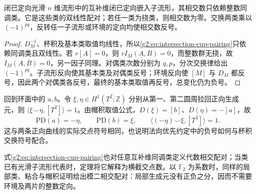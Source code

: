 \begin{corollary}\label{g2:cor:intersection-homological-invariance}
	闭已定向光滑 \(n\) 维流形中的互补维闭已定向嵌入子流形，其相交数只依赖整数同调类。它是这些类的双线性配对；若任一类为挠类，则相交数为零。交换两类乘以 \((-1)^{pq}\)，反转任一子流形或环境的定向均使相交数反号。
\end{corollary}
\begin{proof}
	\(D_M^{-1}\)、杯积及基本类取值均线性，所以\eqref{g2:eq:intersection-cup-pairing}只依赖同调类且双线性。若 \(r[A]=0\)，则 \(rI_M(A,B)=0\)，而整数群无挠，故 \(I_M(A,B)=0\)，另一因子同理。对偶类次数分别为 \(q,p\)，分次交换律给出 \((-1)^{pq}\)。子流形反向使其基本类及对偶类反号；环境反向使 \([M]\) 与 \(D_M\) 都反号，因此两个对偶类各反号，最终的基本类取值再反号，总变化仍为负号。
\end{proof}

\begin{example}\label{g2:exm:torus-poincare-sign-check}
	回到环面中的 \(a,b\)。令 \(\xi,\eta\in H^1(T^2;\mathbb Z)\) 分别从第一、第二圆周拉回正向生成元，则 \(\langle\xi\smile\eta,[T^2]\rangle=1\)。由帽积取值公式，\(D(\xi)=[b]\)、\(D(\eta)=-[a]\)，故
	\[
		\mathrm{PD}(a)=-\eta,\qquad \mathrm{PD}(b)=\xi,\qquad
		\langle(-\eta)\smile\xi,[T^2]\rangle=1.
	\]
	这与两条正向曲线的实际交点符号相同，也说明法向优先约定中的负号如何与杯积交换符号配合。
\end{example}

式\eqref{g2:eq:intersection-cup-pairing}也对任意互补维同调类定义代数相交配对；当类已有光滑子流形代表时，定理将它解释为横截交点数。以 \(\mathbb F_2\) 为系数时，同样的局部类、粘合与帽积证明给出模二相交配对：局部生成元没有正负之分，因而不需要环境及两片的整数定向。
